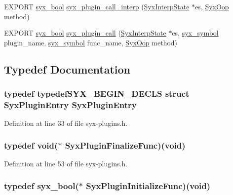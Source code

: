 \begin{CompactItemize}
\item 
EXPORT \hyperlink{syx-types_8h_c6dc09b276b99fa1956364359139daab}{syx\_\-bool} \hyperlink{syx-plugins_8h_24a2010c317aa2f5bf36c97fce248e86}{syx\_\-plugin\_\-call\_\-interp} (\hyperlink{struct_syx_interp_state}{SyxInterpState} $\ast$es, \hyperlink{syx-types_8h_1121caba2d40b2ce090b640762744ccd}{SyxOop} method)
\item 
EXPORT \hyperlink{syx-types_8h_c6dc09b276b99fa1956364359139daab}{syx\_\-bool} \hyperlink{syx-plugins_8h_99c8b337d39d90381b4f135dcd597e4c}{syx\_\-plugin\_\-call} (\hyperlink{struct_syx_interp_state}{SyxInterpState} $\ast$es, \hyperlink{syx-types_8h_9663af54b7b72f5d8be5f754ef356525}{syx\_\-symbol} plugin\_\-name, \hyperlink{syx-types_8h_9663af54b7b72f5d8be5f754ef356525}{syx\_\-symbol} func\_\-name, \hyperlink{syx-types_8h_1121caba2d40b2ce090b640762744ccd}{SyxOop} method)
\end{CompactItemize}


\subsection{Typedef Documentation}
\hypertarget{syx-plugins_8h_586263d5ec765059867a1a3378b96cd2}{
\subsubsection{\setlength{\rightskip}{0pt plus 5cm}typedef typedefSYX\_\-BEGIN\_\-DECLS struct {\bf SyxPluginEntry} {\bf SyxPluginEntry}}}
\label{syx-plugins_8h_586263d5ec765059867a1a3378b96cd2}




Definition at line 33 of file syx-plugins.h.\hypertarget{syx-plugins_8h_f831d8617aaf59d5ff5c167f613fa41c}{
\subsubsection{\setlength{\rightskip}{0pt plus 5cm}typedef void($\ast$  {\bf SyxPluginFinalizeFunc})(void)}}
\label{syx-plugins_8h_f831d8617aaf59d5ff5c167f613fa41c}




Definition at line 53 of file syx-plugins.h.\hypertarget{syx-plugins_8h_23d3afe78580c4501c61126a634cc427}{
\subsubsection{\setlength{\rightskip}{0pt plus 5cm}typedef {\bf syx\_\-bool}($\ast$  {\bf SyxPluginInitializeFunc})(void)}}
\label{syx-plugins_8h_23d3afe78580c4501c61126a634cc427}




